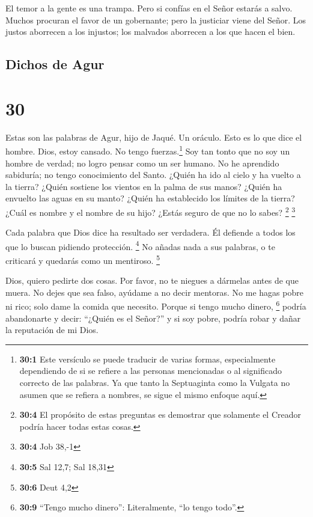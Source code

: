  El temor a la gente es una trampa. Pero si confías en el
Señor estarás a salvo.  Muchos procuran el favor de un
gobernante; pero la justiciar viene del Señor.  Los
justos aborrecen a los injustos; los malvados aborrecen a los que hacen
el bien.

\hypertarget{dichos-de-agur}{%
\subsection{Dichos de Agur}\label{dichos-de-agur}}

\hypertarget{section-29}{%
\section{30}\label{section-29}}

 Estas son las palabras de Agur, hijo de Jaqué. Un
oráculo. Esto es lo que dice el hombre. Dios, estoy cansado. No tengo
fuerzas.\footnote{\textbf{30:1} Este versículo se puede traducir de
  varias formas, especialmente dependiendo de si se refiere a las
  personas mencionadas o al significado correcto de las palabras. Ya que
  tanto la Septuaginta como la Vulgata no asumen que se refiera a
  nombres, se sigue el mismo enfoque aquí.}  Soy tan tonto
que no soy un hombre de verdad; no logro pensar como un ser humano.
 No he aprendido sabiduría; no tengo conocimiento del
Santo.  ¿Quién ha ido al cielo y ha vuelto a la tierra?
¿Quién sostiene los vientos en la palma de sus manos? ¿Quién ha envuelto
las aguas en su manto? ¿Quién ha establecido los límites de la tierra?
¿Cuál es nombre y el nombre de su hijo? ¿Estás seguro de que no lo
sabes? \footnote{\textbf{30:4} El propósito de estas preguntas es
  demostrar que solamente el Creador podría hacer todas estas cosas.}
\footnote{\textbf{30:4} Job 38,-1}

 Cada palabra que Dios dice ha resultado ser verdadera. Él
defiende a todos los que lo buscan pidiendo protección. \footnote{\textbf{30:5}
  Sal 12,7; Sal 18,31}  No añadas nada a sus palabras, o
te criticará y quedarás como un mentiroso. \footnote{\textbf{30:6} Deut
  4,2}

 Dios, quiero pedirte dos cosas. Por favor, no te niegues
a dármelas antes de que muera.  No dejes que sea falso,
ayúdame a no decir mentoras. No me hagas pobre ni rico; solo dame la
comida que necesito.  Porque si tengo mucho dinero,
\footnote{\textbf{30:9} ``Tengo mucho dinero'': Literalmente, ``lo tengo
  todo''.} podría abandonarte y decir: ``¿Quién es el Señor?'' y si soy
pobre, podría robar y dañar la reputación de mi Dios.

